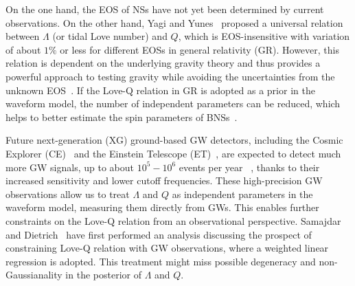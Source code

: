 \documentclass[a4paper,11pt]{article}
\begin{document}
On the one hand, the EOS of NSs have not yet been determined by current
observations. On the
other hand, Yagi 
and Yunes~\cite{Yagi:2013bca,Yagi:2013awa} proposed a universal relation between 
$\Lambda$ (or tidal Love number) and $Q$, which is EOS-insensitive 
with variation of about $1\%$ or less for different EOSs in general relativity (GR).
However, this relation is dependent on the underlying gravity theory and thus
provides a powerful approach to testing gravity while avoiding the uncertainties
from the unknown EOS~\cite{Yagi:2013bca,Silva:2020acr,Shao:2022koz}. If the Love-Q relation in GR is adopted as a prior in the waveform
model, the number of independent parameters can be reduced, which helps to
better estimate the spin parameters of BNSs~\cite{Yagi:2013bca,LIGOScientific:2018cki,
LIGOScientific:2018hze,LIGOScientific:2020aai}. 

Future next-generation (XG) ground-based GW detectors, including the Cosmic Explorer 
(CE)~\cite{Reitze:2019iox,Reitze:2019dyk} and the Einstein Telescope (ET)~\cite{Punturo:2010zz,Hild:2010id,Sathyaprakash:2012jk}, 
are expected to
 detect much more GW signals, up to about $10^5-10^6$ events per year
~\cite{LIGOScientific:2017zlf,Sathyaprakash:2019yqt,Kalogera:2021bya,Samajdar:2021egv}, 
thanks to their 
increased sensitivity and lower cutoff frequencies. These high-precision GW observations allow us to treat $\Lambda$ and $Q$ as independent parameters in the waveform model, measuring them directly from GWs. This enables further constraints on the Love-Q relation from an observational perspective.
Samajdar and Dietrich~\cite{Samajdar:2020xrd} 
have first performed an analysis discussing the prospect of constraining Love-Q 
relation with GW observations, where a weighted linear regression is adopted.
This treatment might miss possible degeneracy and non-Gaussianality in the posterior of $\Lambda$ and $Q$. 
\end{document}
